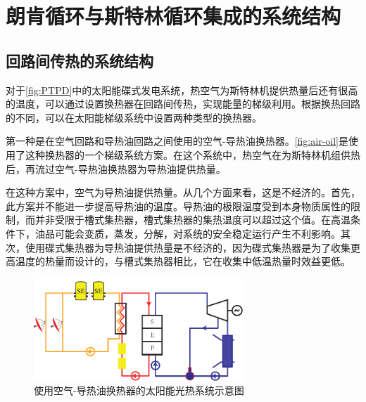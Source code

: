 \section{朗肯循环与斯特林循环集成的系统结构}

\subsection{回路间传热的系统结构}
\label{sec:hebc}

对于\autoref{fig:PTPD}中的太阳能碟式发电系统，热空气为斯特林机提供热量后还有很高的温度，可以通过设置换热器在回路间传热，实现能量的梯级利用。根据换热回路的不同，可以在太阳能梯级系统中设置两种类型的换热器。

第一种是在空气回路和导热油回路之间使用的空气-导热油换热器。\autoref{fig:air-oil}是使用了这种换热器的一个梯级系统方案。在这个系统中，热空气在为斯特林机组供热后，再流过空气-导热油换热器为导热油提供热量。

在这种方案中，空气为导热油提供热量。从几个方面来看，这是不经济的。首先，此方案并不能进一步提高导热油的温度。导热油的极限温度受到本身物质属性的限制，而并非受限于槽式集热器，槽式集热器的集热温度可以超过这个值。在高温条件下，油品可能会变质，蒸发，分解，对系统的安全稳定运行产生不利影响。其次，使用碟式集热器为导热油提供热量是不经济的，因为碟式集热器是为了收集更高温度的热量而设计的，与槽式集热器相比，它在收集中低温热量时效益更低。

\begin{figure}[ht]
\centering 
\includegraphics[width=0.7\textwidth]{fig/air-oil}
\caption{使用空气-导热油换热器的太阳能光热系统示意图}\label{fig:air-oil}
\end{figure}

